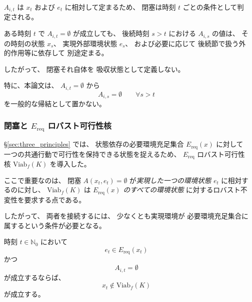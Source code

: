 \begin{remark}[閉塞は吸収状態として定義されない]
\label{rem:blockage_time_dependence}
$A_{i,t}$ は
$x_t$ および $e_t$ に相対して定まるため、
閉塞は時刻 $t$ ごとの条件として判定される。

ある時刻 $t$ で
$A_{i,t}=\emptyset$
が成立しても、
後続時刻 $s>t$ における
$A_{i,s}$
の値は、
その時刻の状態 $x_s$、
実現外部環境状態 $e_s$、
および必要に応じて
後続節で扱う外的作用等に依存して
別途定まる。

したがって、
閉塞それ自体を
吸収状態として定義しない。

特に、本論文は、
$A_{i,t}=\emptyset$
から
\[
  A_{i,s}=\emptyset
  \qquad
  \forall s>t
\]
を一般的な帰結として置かない。
\end{remark}

\subsubsection{閉塞と $E_{\mathrm{req}}$ ロバスト可行性核}

\S\ref{sec:three_principles} では、
状態依存の必要環境充足集合
$E_{\mathrm{req}}(x)$ に対して
一つの共通行動で可行性を保持できる状態を捉えるため、
$E_{\mathrm{req}}$ ロバスト可行性核
$\mathrm{Viab}_f(K)$
を導入した。

ここで重要なのは、
閉塞
$A(x_t,e_t)=\emptyset$
が\emph{実現した一つの環境状態 $e_t$}
に相対するのに対し、
$\mathrm{Viab}_f(K)$ は
\emph{$E_{\mathrm{req}}(x)$ のすべての環境状態}
に対するロバスト不変性を要求する点である。

したがって、
両者を接続するには、
少なくとも実現環境が
必要環境充足集合に属するという条件が必要となる。

\begin{proposition}
\label{prop:blockage_viability_kernel}
時刻 $t\in\mathbb{N}_0$ において
\[
  e_t\in E_{\mathrm{req}}(x_t)
\]
かつ
\[
  A_{i,t}=\emptyset
\]
が成立するならば、
\[
  x_t\notin\mathrm{Viab}_f(K)
\]
が成立する。
\end{proposition}

